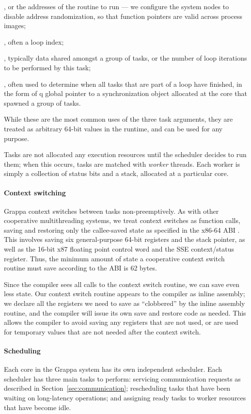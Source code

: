 ,
or the addresses of the routine to run --- we configure the system nodes to
disable address randomization, so that function pointers are valid across
process images; 

, often a loop index; 

, typically data shared amongst a group of tasks, or the number of
loop iterations to be performed by this task; 

, often used to determine when all
tasks that are part of a loop have finished, in the form of q global pointer
to a synchronization object allocated at the core that spawned a group of
tasks.

While these are the most common uses of the three task arguments, they are
treated as arbitrary 64-bit values in the runtime, and can be used for any
purpose.

Tasks are not allocated any execution resources until the scheduler
decides to run them; when this occurs, tasks are matched with {\em
  worker} threads. Each worker is simply a collection of status bits and a
stack, allocated at a particular core.

\paragraph{Context switching} Grappa context switches between tasks
non-preemptively. As with other cooperative multithreading systems, we
treat context switches as function calls, saving and restoring only the
callee-saved state as specified in the x86-64 ABI \cite{amd64:abi:2012}. This
involves saving six general-purpose 64-bit registers and the stack
pointer, as well as the 16-bit x87 floating point control word and the
SSE context/status register. Thus, the minimum amount of state a
cooperative context switch routine must save according to the ABI is 62
bytes.

Since the compiler sees all calls to the context switch routine, we
can save even less state. Our context switch routine appears to the
compiler as inline assembly; we declare all the registers we need
to save as ``clobbered'' by the inline assembly routine, and the
compiler will issue its own save and restore code as needed. This allows the
compiler to avoid saving any registers that are not used, or are used
for temporary values that are not needed after the context switch.

\paragraph{Scheduling} Each core in the Grappa system has its own
independent scheduler. Each scheduler has three main tasks to perform:
servicing communication requests as described in
Section~\ref{sec:communication}; rescheduling tasks that have been
waiting on long-latency operations; and assigning ready tasks to
worker resources that have become idle.


